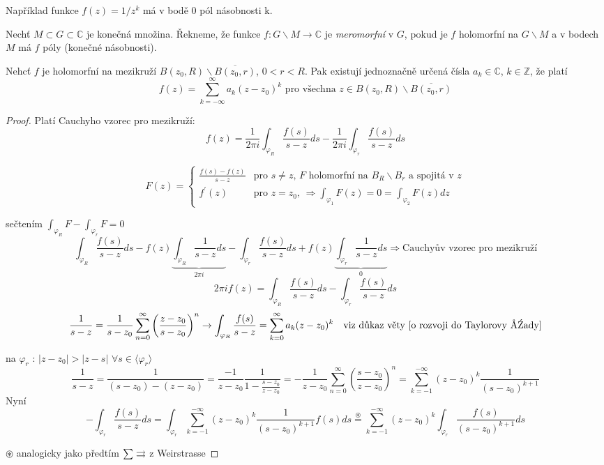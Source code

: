 Například funkce $f(z) = 1 / z^k$ má v bodě 0 pól násobnosti k.

\begin{definice}
Nechť $M \subset G \subset \mathbb{C}$ je konečná množina. Řekneme, že funkce $f : G \backslash M \rightarrow \mathbb{C}$ je \emph{meromorfní} v $G$, pokud je $f$ holomorfní na $G \backslash M$ a v bodech $M$ má $f$ póly (konečné násobnosti).
\end{definice}

\begin{vetat}
Nehcť $f$ je holomorfní na mezikruží $B(z_0, R) \backslash \overline{B(z_0, r)}$, $0 < r < R$. Pak existují jednoznačně určená čísla $a_k \in \mathbb{C}$, $k \in \mathbb{Z}$, že platí 
$$f(z) = \sum_{k= - \infty}^\infty a_k (z-z_0)^k \textrm{ pro všechna } z \in B(z_0, R) \backslash \overline{B(z_0, r)}$$
\end{vetat}

\begin{proof}
Platí Cauchyho vzorec pro mezikruží:
$$f(z) = \frac{1}{2 \pi i} \int_{\varphi_R} \frac{f(s)}{s-z} ds - \frac{1}{2 \pi i} \int_{\varphi_r} \frac{f(s)}{s-z} ds$$

\begin{equation*}
F(z) = \left\{ \begin{array}{ll}
 \frac{f(s)-f(z)}{s-z} & \textrm{pro $s \neq z$, $F$ holomorfní na $B_R \backslash B_r$ a spojitá v $z$} \\
 f^\prime(z) & \textrm{pro $z=z_0$, $\Rightarrow \int_{\varphi_1} F(z) = 0 = \int_{\varphi_2} F(z) dz$}
  \end{array} \right.
\end{equation*}

sečtením $\int_{\varphi_R} F - \int_{\varphi_r} F = 0$
$$\int_{\varphi_R} \frac{f(s)}{s-z} ds - f(z) \underbrace{\int_{\varphi_R} \frac{1}{s-z} ds}_{2 \pi i} - \int_{\varphi_r} \frac{f(s)}{s-z} ds + f(z) \underbrace{\int_{\varphi_r} \frac{1}{s-z} ds}_{0} \Rightarrow \textrm{Cauchyův vzorec pro mezikruží}$$
$$2 \pi i f(z) = \int_{\varphi_R} \frac{f(s)}{s-z} ds - \int_{\varphi_r} \frac{f(s)}{s-z} ds$$
$$\frac{1}{s-z} = \frac{1}{s-z_0} \sum_{n=0}^\infty \left( \frac{z-z_0}{s-z_0} \right)^n \to \int_{\varphi_R} \frac{f(s)}{s-z} = \sum_{k=0}^\infty a_k (z-z_0)^k \quad \textrm{viz důkaz věty \ref{o rozvoji do Taylorovy řady}}$$

na $\varphi_r$ : $|z-z_0| > |z-s|$ $\forall s \in \langle \varphi_r \rangle$
$$\frac{1}{s-z} = \frac{1}{(s-z_0)-(z-z_0)} = \frac{-1}{z-z_0} \frac{1}{1 - \frac{s-z_0}{z-z_0}} = - \frac{1}{z-z_0} \sum_{n=0}^\infty \left( \frac{s-z_0}{z-z_0} \right)^n = \sum_{k=-1}^{-\infty} (z-z_0)^k \frac{1}{(s-z_0)^{k+1}}$$
Nyní
$$- \int_{\varphi_r} \frac{f(s)}{s-z} ds = \int_{\varphi_r} \sum_{k=-1}^{-\infty} (z-z_0)^k \frac{1}{(s-z_0)^{k+1}} f(s) ds \overset{\circledast}{=} \sum_{k=-1}^{-\infty} (z-z_0)^{k} \int_{\varphi_r} \frac{f(s)}{(s-z_0)^{k+1}} ds$$

$\circledast$ analogicky jako předtím $\sum \rightrightarrows$ z Weirstrasse
\end{proof}
